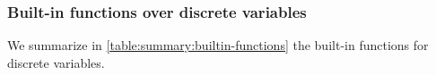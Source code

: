 %
%




\subsubsection{Built-in functions over discrete variables}\label{section:builtin-functions}

We summarize in \cref{table:summary:builtin-functions} the built-in functions for discrete variables.

